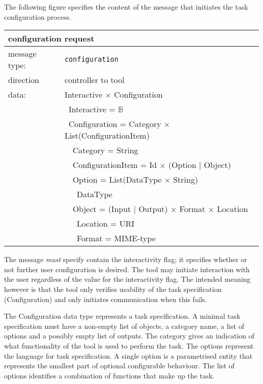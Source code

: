 \documentclass{article}
\newcommand{\msg}[1]{\texttt{#1}}
\begin{document}
   The following figure specifies the content of the message that initiates the
   task configuration process.
   \begin{table}[H]
    \begin{center}
     \begin{tabular}{|ll|}
      \hline
       \multicolumn{2}{|l|}{\textbf{configuration request}} \\
      \hline
       message type:   & \msg{configuration} \\
      \hline
       direction       & controller to tool \\
       data:           & Interactive $\times$ Configuration \\
                       & \ Interactive = $\mathbb{B}$ \\
                       & \ Configuration = Category $\times$ List(ConfigurationItem) \\
                       & \ \ Category = String \\
                       & \ \ ConfigurationItem = Id $\times$ (Option $|$ Object) \\
                       & \ \ Option = List(DataType $\times$ String) \\
                       & \ \ \ DataType \\
                       & \ \ Object = (Input $|$ Output) $\times$ Format $\times$ Location \\
                       & \ \ \ Location = URI \\
                       & \ \ \ Format   = MIME-type \\
      \hline
     \end{tabular}
     \vspace{-0.3cm}
    \end{center}
   \end{table}

   \noindent The message \emph{must} specify contain the interactivity flag; it
   specifies whether or not further user configuration is desired. The tool may
   initiate interaction with the user regardless of the value for the
   interactivity flag. The intended meaning however is that the tool only
   verifies usability of the task specification (Configuration) and only
   initiates communication when this fails.

   The Configuration data type represents a task specification. A minimal task
   specification must have a non-empty list of objects, a category name, a list
   of options and a possibly empty list of outputs. The category gives an
   indication of what functionality of the tool is used to perform the task.
   The options represent the language for task specification. A single option
   is a parametrised entity that represents the smallest part of optional
   configurable behaviour. The list of options identifies a combination of
   functions that make up the task. 
\end{document}
